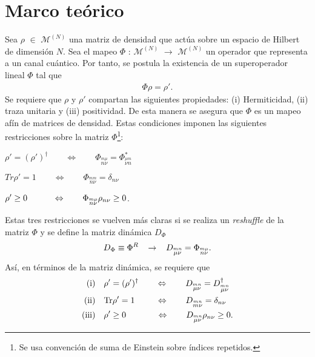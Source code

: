 \documentclass[11pt]{article}
\begin{document}
\section*{Marco teórico}
Sea $\rho$ $\in$ $\mathcal{M}^{(N)}$ una matriz de densidad que actúa sobre un espacio de Hilbert de dimensión $N$. Sea el mapeo $\Phi$ : $\mathcal{M}^{(N)}$ $\to$ $\mathcal{M}^{(N)}$ un operador que representa a un canal cuántico. Por tanto, se postula la existencia de un superoperador lineal $\Phi$ tal que
\begin{align}
	\Phi \rho = \rho '.
\end{align}
Se requiere que $\rho$ y $\rho '$ compartan las siguientes propiedades: (i) Hermiticidad, (ii) traza unitaria y (iii) positividad. De esta manera se asegura que $\Phi$ es un mapeo afín de matrices de densidad. Estas condiciones imponen las siguientes restricciones sobre la matriz $\Phi$\footnote{Se usa convención de suma de Einstein sobre índices repetidos.}:
\begin{description}
\centering
	\item[(i)] $\rho ' = (\rho ')^{\dagger} \qquad \Leftrightarrow \qquad \Phi _{\stackrel{m \mu}{n \nu}} = \Phi ^{*}_{\stackrel{\mu m}{\nu n}}$
	\item[(ii)] $Tr \rho ' = 1 \qquad \Leftrightarrow \qquad \Phi _{\stackrel{m m}{n \nu}} = \delta _{n\nu}$
	\item[(iii)] $\rho ' \geq 0 \hspace{0.35cm} \qquad \Leftrightarrow \qquad \Phi _{\stackrel{m \mu}{n \nu}}\rho _{n\nu} \geq 0$.
\end{description}
Estas tres restricciones se vuelven más claras si se realiza un \textit{reshuffle} de la matriz $\Phi$ y se define la matriz dinámica $D_{\Phi}$ 
\begin{align}
	D_{\Phi} \equiv \Phi ^R		\hspace{0.3cm} \rightarrow \hspace{0.3cm} 	D_{\stackrel{m n}{\mu \nu}} = \Phi _{\stackrel{m \mu}{n \nu}}. 
\end{align} Así, en términos de la matriz dinámica, se requiere que
\begin{align}
	\text{(i)}	& \quad	\rho ' = (\rho ')^{\dagger} \qquad	\Leftrightarrow	\quad \quad	D_{\stackrel{m n}{\mu \nu}} = D ^{\dagger}_{\stackrel{m n}{\mu \nu}} \\
	\text{(ii)}	& \quad	\text{Tr} \rho ' = 1 \hspace{1.7mm} \qquad	\Leftrightarrow	\quad \quad	D_{\stackrel{m n}{m \nu}} = \delta _{n \nu} \\
	\text{(iii)}	& \quad	\rho ' \geq 0 \hspace{5.5mm} \qquad	\Leftrightarrow	\quad \quad	D_{\stackrel{m n}{\mu \nu}} \rho _{n \nu} \geq 0 . 
\end{align}
\end{document}
